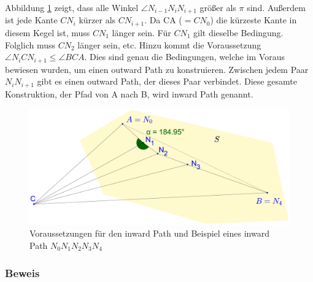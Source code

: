 \documentclass[a4paper,twoside]{IEEEtran}
\begin{document}
Abbildung \ref{fig:inward_path_prop} zeigt, dass alle Winkel $\angle{N_{i-1}N_iN_{i+1}} $ größer als $\pi $ sind.
Außerdem ist jede Kante $CN_i $ kürzer als $CN_{i+1}$. 
Da CA ($= CN_0 $) die kürzeste Kante in diesem Kegel ist, muss $CN_1 $ länger sein. 
Für $CN_1 $ gilt dieselbe Bedingung. 
Folglich muss $CN_2 $ länger sein, etc.
Hinzu kommt die Voraussetzung $\angle{N_iCN_{i+1}} \leq \angle{BCA} $.
Dies sind genau die Bedingungen, welche im Voraus bewiesen wurden, um einen outward Path zu konstruieren. 
Zwischen jedem Paar $N_iN_{i+1} $ gibt es einen outward Path, der dieses Paar verbindet.
Diese gesamte Konstruktion, der Pfad von A nach B, wird inward Path genannt.

\begin{figure}[h!]
\centering
\includegraphics[width=1\linewidth]{inward_path_prop.eps}
\caption{Voraussetzungen für den inward Path und Beispiel eines inward Path $N_0N_1N_2N_3N_4 $}
\label{fig:inward_path_prop}
\end{figure}


\subsubsection{Beweis}









\end{document}
